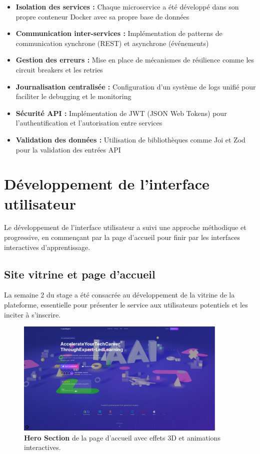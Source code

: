 \begin{itemize}
  \item \textbf{Isolation des services :} Chaque microservice a été développé dans son propre conteneur Docker avec sa propre base de données
  \item \textbf{Communication inter-services :} Implémentation de patterns de communication synchrone (REST) et asynchrone (événements)
  \item \textbf{Gestion des erreurs :} Mise en place de mécanismes de résilience comme les circuit breakers et les retries
  \item \textbf{Journalisation centralisée :} Configuration d'un système de logs unifié pour faciliter le debugging et le monitoring
  \item \textbf{Sécurité API :} Implémentation de JWT (JSON Web Tokens) pour l'authentification et l'autorisation entre services
  \item \textbf{Validation des données :} Utilisation de bibliothèques comme Joi et Zod pour la validation des entrées API
\end{itemize}

\section{Développement de l'interface utilisateur}

Le développement de l'interface utilisateur a suivi une approche méthodique et progressive, en commençant par la page d'accueil pour finir par les interfaces interactives d'apprentissage.

\subsection{Site vitrine et page d'accueil}

La semaine 2 du stage a été consacrée au développement de la vitrine de la plateforme, essentielle pour présenter le service aux utilisateurs potentiels et les inciter à s'inscrire.

\begin{figure}[H]
  \centering
  \includegraphics[width=0.9\textwidth,keepaspectratio]{week_2_img/last_and_improved_hero_section_withe_3d_effects_etc.png}
  \caption{\textbf{Hero Section} de la page d'accueil avec effets 3D et animations interactives.}
  \label{fig:hero_section}
\end{figure}

